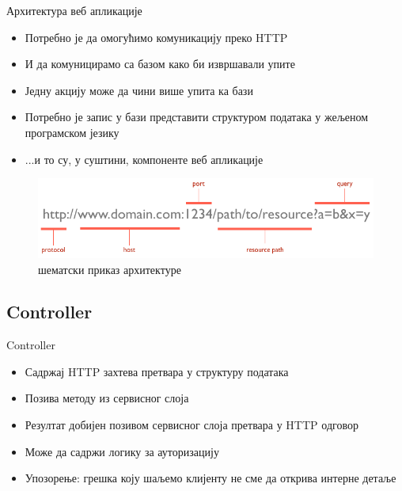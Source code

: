 \documentclass{beamer}
\begin{document}
	\begin{frame}[allowframebreaks]{Архитектура веб апликације}
        \begin{itemize}
			\item Потребно је да омогућимо комуникацију преко HTTP
			\item И да комуницирамо са базом како би извршавали упите
			\item Једну акцију може да чини више упита ка бази
			\item Потребно је запис у бази представити структуром података у жељеном програмском језику
			\item ...и то су, у суштини, компоненте веб апликације
        \end{itemize}
        
        \framebreak
        
        \begin{figure}
            \centering
            \includegraphics[width=\textwidth,height=\textheight,keepaspectratio]{images/url.png}
            \caption{шематски приказ архитектуре}
            \label{fig:url}
        \end{figure}
    \end{frame}
    
    \subsection{Controller}
    
    \begin{frame}{Controller}
        \begin{itemize}
			\item Садржај HTTP захтева претвара у структуру података
			\item Позива методу из сервисног слоја
			\item Резултат добијен позивом сервисног слоја претвара у HTTP одговор
			\item Може да садржи логику за ауторизацију
			\item Упозорење: грешка коју шаљемо клијенту не сме да открива интерне детаље
        \end{itemize}
    \end{frame}
    
\end{document}

